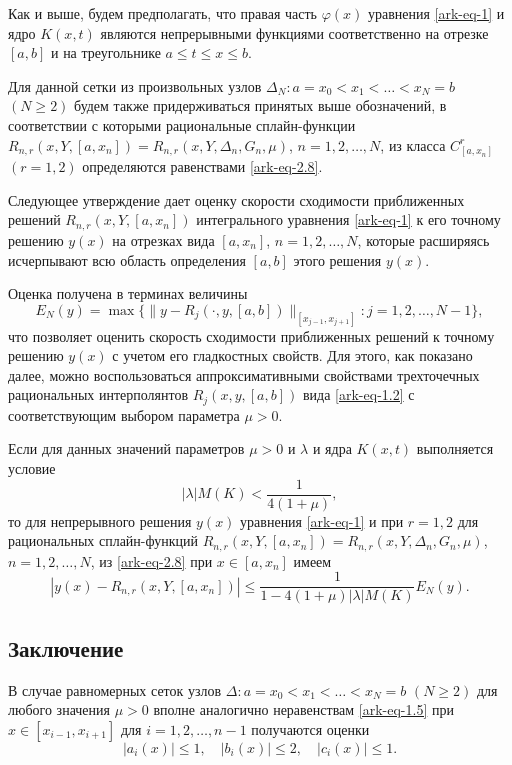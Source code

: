 Как и выше, будем предполагать, что правая часть $\varphi(x)$ уравнения \eqref{ark-eq-1} и ядро
$K(x,t)$ являются непрерывными функциями соответственно на отрезке $[a,b]$ и на треугольнике
$a\leqslant t\leqslant x\leqslant b$.

Для данной сетки из произвольных узлов $\Delta_N: a=x_0<x_1<\dots <x_N=b$ $(N\geqslant 2)$
будем также придерживаться принятых выше обозначений, в соответствии с которыми рациональные
сплайн-функции $R_{n,r}(x,Y,[a,x_n])=R_{n,r}(x,Y,\Delta_n, G_n,\mu)$, $n=1,2,\dots,N$,
из класса $C^r_{[a,x_n]}$ $(r=1,2)$ определяются равенствами \eqref{ark-eq-2.8}.

Следующее утверждение дает оценку скорости сходимости приближенных решений
$R_{n,r}(x,Y,[a,x_n])$ интегрального уравнения \eqref{ark-eq-1} к его точному решению $y(x)$ на
отрезках вида $[a,x_n]$, $n=1,2,\dots,N$, которые расширяясь исчерпывают
всю область определения $[a,b]$ этого решения $y(x)$.

Оценка получена в терминах величины
\begin{equation}\label{ark-eq-3.1}
E_N(y)=\max\{\|y-R_j(\cdot, y, [a,b])\|_{[x_{j-1},x_{j+1}]}:j=1,2,\dots,N-1\},
\end{equation}
что позволяет оценить скорость сходимости приближенных решений к точному решению
$y(x)$ с учетом его гладкостных свойств. Для этого, как показано далее, можно воспользоваться
аппроксимативными свойствами трехточечных рациональных интерполянтов $R_j(x,y,[a,b])$
вида \eqref{ark-eq-1.2} с соответствующим выбором параметра $\mu>0$.

\begin{theorem} \label{ark-theo2}
Если для данных значений параметров $\mu>0$ и $\lambda$ и ядра $K(x,t)$ выполняется
условие
\begin{equation}\label{ark-eq-3.2}
|\lambda| M(K)< \frac 1{4(1+\mu)},
\end{equation}
то для непрерывного решения $y(x)$ уравнения \eqref{ark-eq-1} и при $r=1,2$ для
рациональных сплайн-функций $R_{n,r}(x,Y,[a,x_n])=R_{n,r}(x,Y,\Delta_n, G_n,\mu)$,
$n=1,2,\dots,N$, из \eqref{ark-eq-2.8} при $x\in[a,x_n]$ имеем
\begin{equation}\label{ark-eq-3.3}
|y(x)-R_{n,r}(x, Y,[a,x_n])|\leqslant  \frac 1{1-4(1+\mu)|\lambda|M(K)}E_N(y).
\end{equation}
\end{theorem}


\subsection{Заключение}
В случае равномерных сеток узлов $\Delta: a=x_0<x_1<\dots<x_N=b$ $(N\geqslant 2)$ для любого
значения $\mu>0$ вполне аналогично неравенствам \eqref{ark-eq-1.5} при $x\in[x_{i-1}, x_{i+1}]$
для $i=1,2,\dots,n-1$ получаются оценки
$$
|a_i(x)|\leqslant 1,\quad |b_i(x)|\leqslant 2,\quad |c_i(x)|\leqslant 1.
$$

